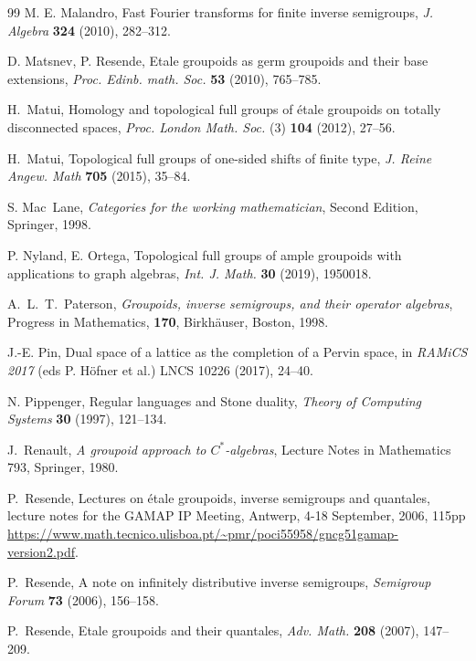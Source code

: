 \documentclass[a4paper]{amsart}
\begin{document}
\begin{thebibliography}{99}
 M. E. Malandro, Fast Fourier transforms for finite inverse semigroups, {\em J. Algebra} {\bf 324} (2010), 282--312.

 D. Matsnev, P. Resende, Etale groupoids as germ groupoids and their base extensions, {\em Proc. Edinb. math. Soc.} {\bf 53} (2010), 765--785.

 H.~Matui, Homology and topological full groups of \'etale groupoids on totally disconnected spaces,  {\em Proc. London Math. Soc.} (3) {\bf 104} (2012), 27--56.

 H.~Matui, Topological full groups of one-sided shifts of finite type, {\em J. Reine Angew. Math} {\bf 705} (2015), 35--84.

 S. Mac~Lane, {\em Categories for the working mathematician}, Second Edition, Springer, 1998.

 P. Nyland, E. Ortega, Topological full groups of ample groupoids with applications to graph algebras, {\em Int. J. Math.} {\bf 30} (2019), 1950018.

 A.~L.~T.~Paterson, {\em  Groupoids, inverse semigroups, and their operator algebras}, Progress in Mathematics,  {\bf 170}, Birkh\"auser,  Boston, 1998.

 J.-E. Pin, Dual space of a lattice as the completion of a Pervin space, in {\em RAMiCS 2017} (eds P. H\"ofner et al.) LNCS 10226 (2017), 24--40.

 N. Pippenger, Regular languages and Stone duality, {\em Theory of Computing Systems} {\bf 30} (1997), 121--134.

 J.~Renault, {\em A groupoid approach to $ C^*$-algebras},  Lecture Notes in Mathematics 793, Springer, 1980.


 P.~Resende, Lectures on \'etale groupoids, inverse semigroups and quantales, lecture notes for the GAMAP IP Meeting, Antwerp, 4-18 September, 2006, 115pp
\url{https://www.math.tecnico.ulisboa.pt/~pmr/poci55958/gncg51gamap-version2.pdf}.

 P.~Resende, A note on infinitely distributive inverse semigroups, {\em Semigroup Forum} {\bf 73} (2006), 156--158.

 P.~Resende, Etale groupoids and their quantales, {\em Adv. Math.} {\bf 208} (2007), 147--209.


\end{thebibliography}
\end{document}
